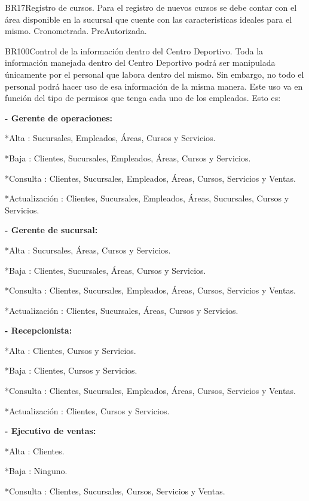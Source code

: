 \begin{BussinesRule}{BR17}{Registro de cursos.} 
	\BRitem[Descripción:] Para el registro de nuevos cursos se debe contar con el área disponible en la sucursal que cuente con las caracteristicas ideales para el mismo.
	\BRitem[Tipo:] Cronometrada.
	\BRitem[Nivel:] PreAutorizada.
\end{BussinesRule}

\begin{BussinesRule}{BR100}{Control de la información dentro del Centro Deportivo.} 
	\BRitem[Descripción:] Toda la información manejada dentro del Centro Deportivo podrá ser manipulada únicamente por el personal que labora dentro del mismo. Sin embargo, no todo el personal podrá hacer uso de esa información de la misma manera. Este uso va en función del tipo de permisos que tenga cada uno de los empleados. Esto es:
		
{\bf - Gerente de operaciones:}

	*Alta : Sucursales, Empleados, Áreas, Cursos y Servicios.
	
	*Baja : Clientes, Sucursales, Empleados, Áreas, Cursos y Servicios.
	
	*Consulta : Clientes, Sucursales, Empleados, Áreas, Cursos, Servicios y Ventas.
	
	*Actualización : Clientes, Sucursales, Empleados, Áreas, Sucursales, Cursos y Servicios.

{\bf- Gerente de sucursal:}
	
	*Alta : Sucursales, Áreas, Cursos y Servicios.
	
	*Baja : Clientes, Sucursales, Áreas, Cursos y Servicios.
	
	*Consulta : Clientes, Sucursales, Empleados, Áreas, Cursos, Servicios y Ventas.
	
	*Actualización : Clientes, Sucursales, Áreas, Cursos y Servicios.

{\bf- Recepcionista:}

	*Alta : Clientes, Cursos y Servicios.
	
	*Baja : Clientes, Cursos y Servicios.
	
	*Consulta : Clientes, Sucursales, Empleados, Áreas, Cursos, Servicios y Ventas.
	
	*Actualización : Clientes, Cursos y Servicios.

{\bf- Ejecutivo de ventas:}

	*Alta : Clientes.
	
	*Baja : Ninguno.
	
	*Consulta : Clientes, Sucursales, Cursos, Servicios y Ventas.
	

\end{BussinesRule}
